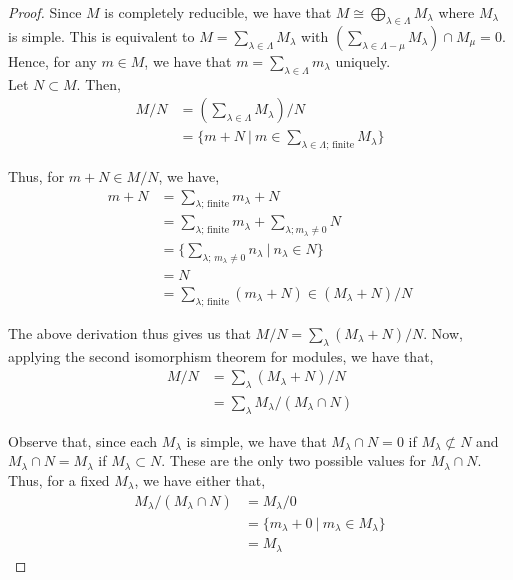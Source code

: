 \documentclass[11pt, reqno]{amsart}
\theoremstyle{plain}
\theoremstyle{definition}
\theoremstyle{example}
\begin{document}
\begin{proof}
Since $M$ is completely reducible, we have that $M \cong \bigoplus_{\lambda \in \Lambda}M_\lambda$ where $M_{\lambda}$ is simple. This is equivalent to $M = \sum_{\lambda \in \Lambda} M_{\lambda}$ with $\left(\sum_{\lambda \in \Lambda - \mu} M_{\lambda} \right) \cap M_{\mu} = 0$. Hence, for any $m \in M$, we have that $m = \sum_{\lambda \in \Lambda} m_{\lambda}$ uniquely.\\

Let $N \subset M$. Then,
\begin{align*}
M/N &= \left(\sum_{\lambda \in \Lambda} M_{\lambda} \right)/N\\
&= \{m + N \ | \ m \in \sum_{\lambda \in \Lambda \text{; finite}} M_{\lambda}\}
\end{align*}

Thus, for $m + N \in M/N$, we have,
\begin{align*}
m + N &= \sum_{\lambda \text{; finite}} m_{\lambda} + N\\
&= \sum_{\lambda \text{; finite}} m_{\lambda} + \sum_{\lambda; m_{\lambda} \neq 0} N\\
&= \{\sum_{\lambda \text{; } m_{\lambda} \neq 0} n_{\lambda} \ | \ n_{\lambda} \in N\}\\
&= N\\
&= \sum_{\lambda \text{; finite}} (m_{\lambda} + N) \in (M_{\lambda} + N)/N
\end{align*}

The above derivation thus gives us that $M/N = \sum_{\lambda} (M_{\lambda} + N)/N$. Now, applying the second isomorphism theorem for modules, we have that,
\begin{align*}
M/N &= \sum_{\lambda} (M_{\lambda} + N)/N\\
&= \sum_{\lambda} M_{\lambda}/(M_{\lambda} \cap N)
\end{align*}

Observe that, since each $M_{\lambda}$ is simple, we have that $M_{\lambda} \cap N = 0$ if $M_{\lambda} \not\subset N$ and $M_{\lambda} \cap N = M_{\lambda}$ if $M_{\lambda} \subset N$. These are the only two possible values for $M_{\lambda} \cap N$. Thus, for a fixed $M_{\lambda}$, we have either that,
\begin{align*}
M_{\lambda}/(M_{\lambda} \cap N) &= M_{\lambda}/0\\
&= \{m_{\lambda} + 0 \ | \ m_{\lambda} \in M_{\lambda}\}\\
&= M_{\lambda}
\end{align*}


\end{proof}
\end{document}
